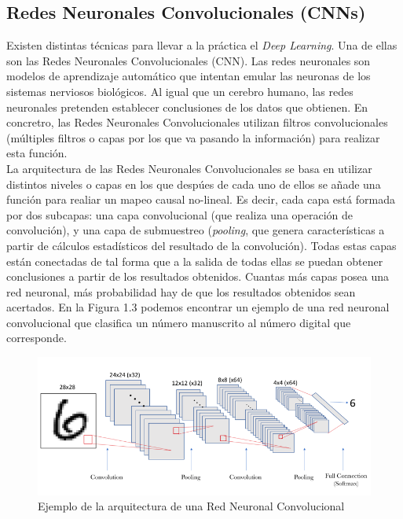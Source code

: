 \documentclass{report}
\begin{document}
\newpage
\subsection{Redes Neuronales Convolucionales (CNNs)}

Existen distintas técnicas para llevar a la práctica el \textit{Deep Learning}. Una de ellas son las Redes Neuronales Convolucionales (CNN). Las redes neuronales son modelos de aprendizaje automático que intentan emular las neuronas de los sistemas nerviosos biológicos. Al igual que un cerebro humano, las redes neuronales pretenden establecer conclusiones de los datos que obtienen. En concretro, las Redes Neuronales Convolucionales utilizan filtros convolucionales (múltiples filtros o capas por los que va pasando la información) para realizar esta función.
\\

La arquitectura de las Redes Neuronales Convolucionales se basa en utilizar distintos niveles o capas en los que despúes de cada uno de ellos se añade una función para realiar un mapeo causal no-lineal. Es decir, cada capa está formada por dos subcapas: una capa convolucional (que realiza una operación de convolución), y una capa de submuestreo (\textit{pooling}, que genera características a partir de cálculos estadísticos del resultado de la convolución). Todas estas capas están conectadas de  tal forma que a la salida de todas ellas se puedan obtener conclusiones a partir de los resultados obtenidos. Cuantas más capas posea una red neuronal, más probabilidad hay de que los resultados obtenidos sean acertados. En la Figura 1.3 podemos encontrar un ejemplo de una red neuronal convolucional que clasifica un número manuscrito al número digital que corresponde. 

\renewcommand{\figurename}{Figura}		
\begin{figure}[h]
	\centering
	 \includegraphics[scale=0.45]{images/ejemplo_cnn.png}
	 \caption{Ejemplo de la arquitectura de una Red Neuronal Convolucional}
\end{figure}
\end{document}
